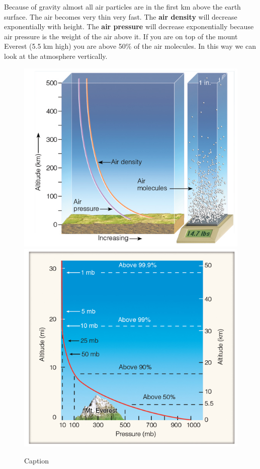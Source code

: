 \documentclass[oneside]{book}
\begin{document}
Because of gravity almost all air particles are in the first km above
the earth surface. The air becomes very thin very fast. The \textbf{air
density} will decrease exponentially with height. The \textbf{air
pressure} will decrease exponentially because air pressure is the weight
of the air above it. If you are on top of the mount Everest (5.5 km
high) you are above 50\% of the air molecules. In this way we can look
at the atmosphere vertically.

\begin{figure}

{\centering \includegraphics[width=0.4\linewidth]{figures/Figure12a} \includegraphics[width=0.4\linewidth]{figures/Figure12b} 

}

\caption{Caption}\label{fig:Layers}
\end{figure}
\end{document}
